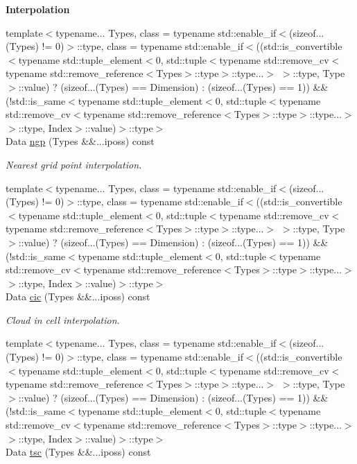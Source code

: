 \begin{Indent}{\bf Interpolation}\par
\begin{DoxyCompactItemize}
\item 
{\footnotesize template$<$typename... Types, class  = typename std\-::enable\-\_\-if$<$(sizeof...(\-Types) != 0)$>$\-::type, class  = typename std\-::enable\-\_\-if$<$((std\-::is\-\_\-convertible$<$typename std\-::tuple\-\_\-element$<$0, std\-::tuple$<$typename std\-::remove\-\_\-cv$<$typename std\-::remove\-\_\-reference$<$\-Types$>$\-::type$>$\-::type...$>$ $>$\-::type, Type$>$\-::value) ? (sizeof...(\-Types) == Dimension) \-: (sizeof...(\-Types) == 1)) \&\& (!std\-::is\-\_\-same$<$typename std\-::tuple\-\_\-element$<$0, std\-::tuple$<$typename std\-::remove\-\_\-cv$<$typename std\-::remove\-\_\-reference$<$\-Types$>$\-::type$>$\-::type...$>$ $>$\-::type, Index$>$\-::value)$>$\-::type$>$ }\\Data \hyperlink{exceptionmagrathea_1_1SimpleHyperOctree_aad15dc180a700eeed43ec708b570ddb2}{ngp} (Types \&\&...iposs) const 
\begin{DoxyCompactList}\small\item\em Nearest grid point interpolation. \end{DoxyCompactList}\item 
{\footnotesize template$<$typename... Types, class  = typename std\-::enable\-\_\-if$<$(sizeof...(\-Types) != 0)$>$\-::type, class  = typename std\-::enable\-\_\-if$<$((std\-::is\-\_\-convertible$<$typename std\-::tuple\-\_\-element$<$0, std\-::tuple$<$typename std\-::remove\-\_\-cv$<$typename std\-::remove\-\_\-reference$<$\-Types$>$\-::type$>$\-::type...$>$ $>$\-::type, Type$>$\-::value) ? (sizeof...(\-Types) == Dimension) \-: (sizeof...(\-Types) == 1)) \&\& (!std\-::is\-\_\-same$<$typename std\-::tuple\-\_\-element$<$0, std\-::tuple$<$typename std\-::remove\-\_\-cv$<$typename std\-::remove\-\_\-reference$<$\-Types$>$\-::type$>$\-::type...$>$ $>$\-::type, Index$>$\-::value)$>$\-::type$>$ }\\Data \hyperlink{exceptionmagrathea_1_1SimpleHyperOctree_ac436cd116bdd7103f30e733a3a377e07}{cic} (Types \&\&...iposs) const 
\begin{DoxyCompactList}\small\item\em Cloud in cell interpolation. \end{DoxyCompactList}\item 
{\footnotesize template$<$typename... Types, class  = typename std\-::enable\-\_\-if$<$(sizeof...(\-Types) != 0)$>$\-::type, class  = typename std\-::enable\-\_\-if$<$((std\-::is\-\_\-convertible$<$typename std\-::tuple\-\_\-element$<$0, std\-::tuple$<$typename std\-::remove\-\_\-cv$<$typename std\-::remove\-\_\-reference$<$\-Types$>$\-::type$>$\-::type...$>$ $>$\-::type, Type$>$\-::value) ? (sizeof...(\-Types) == Dimension) \-: (sizeof...(\-Types) == 1)) \&\& (!std\-::is\-\_\-same$<$typename std\-::tuple\-\_\-element$<$0, std\-::tuple$<$typename std\-::remove\-\_\-cv$<$typename std\-::remove\-\_\-reference$<$\-Types$>$\-::type$>$\-::type...$>$ $>$\-::type, Index$>$\-::value)$>$\-::type$>$ }\\Data \hyperlink{exceptionmagrathea_1_1SimpleHyperOctree_a9eb993e65160ca46268cce30f3caa5c0}{tsc} (Types \&\&...iposs) const 

\end{DoxyCompactItemize}
\end{Indent}

